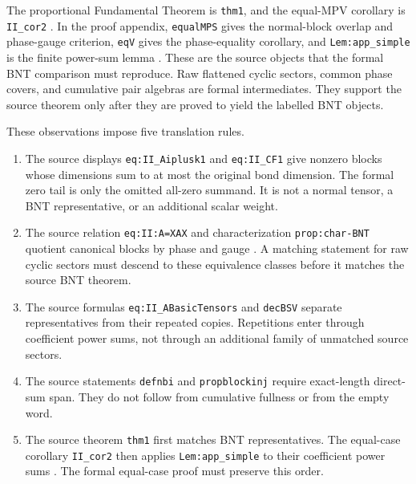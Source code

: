 \documentclass{article}
\begin{document}
The proportional Fundamental Theorem is \texttt{thm1}, and the equal-MPV
corollary is \texttt{II\_cor2}
\cite{Cirac2016MPDO_arXiv}. In the proof appendix,
\texttt{equalMPS} gives the normal-block overlap and phase-gauge criterion,
\texttt{eqV} gives the phase-equality corollary, and
\texttt{Lem:app\_simple} is the finite power-sum lemma
\cite[lines~1155--1163]{Cirac2016MPDO_arXiv}. These are the source objects that
the formal BNT comparison must reproduce. Raw flattened cyclic sectors, common
phase covers, and cumulative pair algebras are formal intermediates. They
support the source theorem only after they are proved to yield the labelled BNT
objects.

These observations impose five translation rules.

\begin{enumerate}
    \item The source displays \texttt{eq:II\_Aiplusk1} and
    \texttt{eq:II\_CF1} give nonzero blocks whose dimensions sum to at most the
    original bond dimension. The formal zero tail is only the omitted all-zero
    summand. It is not a normal tensor, a BNT representative, or an additional
    scalar weight.

    \item The source relation \texttt{eq:II:A=XAX} and characterization
    \texttt{prop:char-BNT} quotient canonical blocks by phase and gauge
    \cite[lines~264--280 and 1135--1148]{Cirac2016MPDO_arXiv}. A matching
    statement for raw cyclic sectors must descend to these equivalence classes
    before it matches the source BNT theorem.

    \item The source formulas \texttt{eq:II\_ABasicTensors} and
    \texttt{decBSV} separate representatives from their repeated copies.
    Repetitions enter through coefficient power sums, not through an additional
    family of unmatched source sectors.

    \item The source statements \texttt{defnbi} and
    \texttt{propblockinj} require exact-length direct-sum span. They do not
    follow from cumulative fullness or from the empty word.

    \item The source theorem \texttt{thm1} first matches BNT representatives.
    The equal-case corollary \texttt{II\_cor2} then applies
    \texttt{Lem:app\_simple} to their coefficient power sums
    \cite{Cirac2016MPDO_arXiv}. The formal equal-case proof must preserve this
    order.
\end{enumerate}
\end{document}
